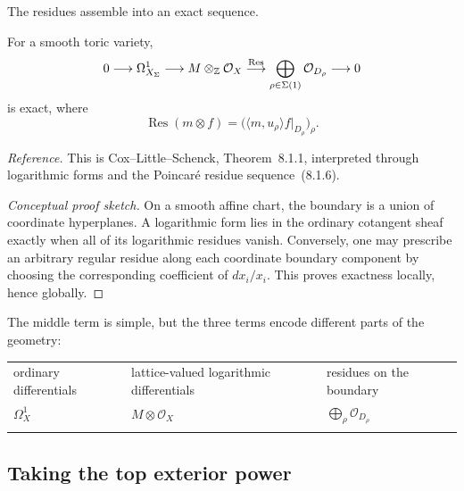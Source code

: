 The residues assemble into an exact sequence.

\begin{theorem}
\label{thm:toric-residue-sequence}
For a smooth toric variety,
\[
0
\longrightarrow
\Omega^1_{X_\Sigma}
\longrightarrow
M\otimes_{\mathbb{Z}}\mathcal{O}_X
\stackrel{\operatorname{Res}}{\longrightarrow}
\bigoplus_{\rho\in\Sigma(1)}\mathcal O_{D_\rho}
\longrightarrow0
\]
is exact, where
\[
\operatorname{Res}(m\otimes f)
=
\bigl(
\langle m,u_\rho\rangle f|_{D_\rho}
\bigr)_\rho.
\]
\end{theorem}

\noindent
\textit{Reference.}
This is Cox--Little--Schenck, Theorem~8.1.1, interpreted through
logarithmic forms and the Poincar\'e residue sequence~(8.1.6).

\begin{proof}[Conceptual proof sketch]
On a smooth affine chart, the boundary is a union of coordinate
hyperplanes. A logarithmic form lies in the ordinary cotangent sheaf
exactly when all of its logarithmic residues vanish. Conversely, one
may prescribe an arbitrary regular residue along each coordinate
boundary component by choosing the corresponding coefficient of
\(dx_i/x_i\). This proves exactness locally, hence globally.
\end{proof}

The middle term is simple, but the three terms encode different
parts of the geometry:

\begin{center}
\small
\renewcommand{\arraystretch}{1.25}
\begin{tabularx}{0.96\linewidth}{@{}
  >{\centering\arraybackslash}X
  >{\centering\arraybackslash}X
  >{\centering\arraybackslash}X@{}}
ordinary differentials
&
lattice-valued logarithmic differentials
&
residues on the boundary
\\
\(\Omega_X^1\)
&
\(M\otimes\mathcal O_X\)
&
\(\displaystyle\bigoplus_\rho\mathcal O_{D_\rho}\)
\\[-1mm]
\multicolumn{3}{c}{\(
\Omega_X^1
\longrightarrow
M\otimes\mathcal O_X
\stackrel{\operatorname{Res}}{\longrightarrow}
\displaystyle\bigoplus_\rho\mathcal O_{D_\rho}
\)}
\end{tabularx}
\end{center}

\subsection{Taking the top exterior power}

